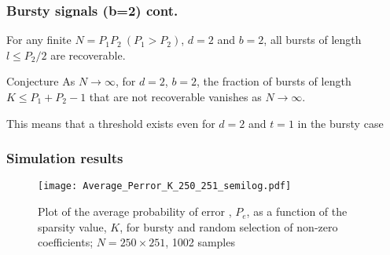 	\begin{frame} \frametitle{Bursty signals (b=2) cont.}
		
		\begin{theorem}
			\color{blue} For any finite $N = P_1 P_2 \ (P_1 > P_2)$, $d=2$ and $b=2$, all bursts of length $l \leq P_2/2$ are recoverable.
		\end{theorem}
		
		\begin{block}{Conjecture}
			\color{blue} As $N \rightarrow \infty$, for $d=2$, $b=2$, the fraction of bursts of length $K \leq P_1+P_2-1$ that are not recoverable vanishes as $N \rightarrow \infty$. 
		\end{block}
		
		\pause
		\begin{block}{}
			This means that a threshold exists even for $d=2$ and $t=1$ in the bursty case
		\end{block}
	\end{frame}
	
	
	\begin{frame}
		
		\frametitle{Simulation results}
		\begin{figure}[t]
			\centering
			\texttt{[image: Average\_Perror\_K\_250\_251\_semilog.pdf]}
			\vspace{-4mm}
			\caption{Plot of the average probability of error , $P_e$, as a function of the sparsity value, $K$, for bursty and random selection of non-zero coefficients; $N=250\times251$, 1002 samples}
			\label{fig:probofsuccess250_251}
		\end{figure}
		
	\end{frame}
	
